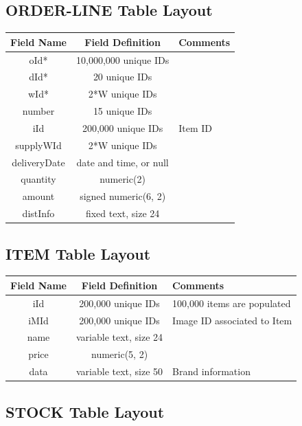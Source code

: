 \subsection{ORDER-LINE Table Layout}

\begin{center}
\begin{tabular}{ |c|c|m{7cm}| } 
 \hline
 Field Name & Field Definition & Comments \\ 
 \hline
 \rowcolor{gray}
 oId* & 10,000,000 unique IDs & \\
 \rowcolor{gray}
 dId* & 20 unique IDs & \\
 \rowcolor{gray}
 wId* & 2*W unique IDs & \\ 
 \rowcolor{gray}
 number & 15 unique IDs & \\
 iId & 200,000 unique IDs & Item ID \\
 supplyWId & 2*W unique IDs  & \\
 deliveryDate & date and time, or null & \\
 quantity & numeric(2)  & \\
 amount & signed numeric(6, 2) & \\ 
 distInfo & fixed text, size 24 & \\
 \hline
\end{tabular}
\end{center}


\subsection{ITEM Table Layout}

\begin{center}
\begin{tabular}{ |c|c|m{7cm}| } 
 \hline
 Field Name & Field Definition & Comments \\ 
 \hline
 \rowcolor{gray}
 iId & 200,000 unique IDs  & 100,000 items are populated \\
 iMId & 200,000 unique IDs & Image ID associated to Item \\
 name & variable text, size 24 & \\
 price & numeric(5, 2) & \\
 data & variable text, size 50 & Brand information \\

 \hline
\end{tabular}
\end{center}

\subsection{STOCK Table Layout}

